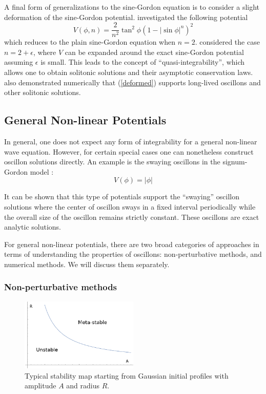 \documentclass{report}
\begin{document}
A final form of generalizations to the sine-Gordon equation is to consider a slight deformation of the sine-Gordon potential. \cite{Ferreira2011} investigated the following potential
\begin{equation}\label{deformed}
  V(\phi, n) = \frac{2}{n^2} \tan^2 \phi \left( 1 - \left|\sin\phi\right|^n \right)^2
\end{equation}
which reduces to the plain sine-Gordon equation when $n=2$. \cite{Ferreira2011} considered the case $n=2+\epsilon$, where $V$ can be expanded around the exact sine-Gordon potential assuming $\epsilon$ is small. This leads to the concept of ``quasi-integrability'', which allows one to obtain solitonic solutions and their asymptotic conservation laws. \cite{Ferreira2011} also demonstrated numerically that (\ref{deformed}) supports long-lived oscillons and other solitonic solutions.

\subsection{General Non-linear Potentials}
In general, one does not expect any form of integrability for a general non-linear wave equation. However, for certain special cases one can nonetheless construct oscillon solutions directly. An example is the swaying oscillons in the signum-Gordon model \cite{Arodz:2011zm}:
\begin{equation}
  V(\phi)=\left|\phi\right|
\end{equation}

It can be shown \cite{Arodz:2011zm} that this type of potentials support the ``swaying'' oscillon solutions where the center of oscillon sways in a fixed interval periodically while the overall size of the oscillon remains strictly constant. These oscillons are exact analytic solutions.

\medbreak

For general non-linear potentials, there are two broad categories of approaches in terms of understanding the properties of oscillons: non-perturbative methods, and numerical methods. We will discuss them separately.

\subsubsection{Non-perturbative methods}
\begin{figure}\centering
  \includegraphics[width=0.5\textwidth]{plot/stability.png}
  \caption{Typical stability map starting from Gaussian initial profiles with amplitude $A$ and radius $R$.}
  \label{stability}
\end{figure}
\end{document}
